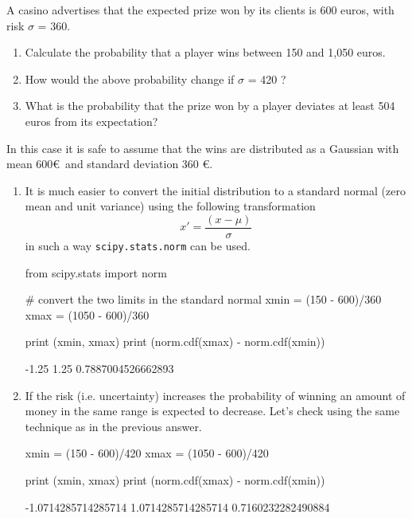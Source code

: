 \begin{question}
A casino advertises that the expected prize won by its clients is 600 euros, with risk $\sigma$ = 360.
\begin{enumerate}[label={\emph{\alph*})}]
	\tightlist
\item Calculate the probability that a player wins between 150 and 1,050 euros.
\item How would the above probability change if $\sigma$ = 420 ?
\item What is the probability that the prize won by a player deviates at least 504 euros from its expectation?
\end{enumerate}
\end{question}

\cprotEnv\begin{solution}
In this case it is safe to assume that the wins are distributed as a Gaussian with mean 600\euro~and standard deviation 360 \euro. 
\begin{enumerate}[label={\emph{\alph*})}]
	\tightlist
\item It is much easier to convert the initial distribution to a standard normal (zero mean and unit variance) using the following transformation
\begin{equation*}
	x' = \frac{(x - \mu)}{\sigma}
\end{equation*}
in such a way \texttt{scipy.stats.norm} can be used.

\begin{ipython}
from scipy.stats import norm

# convert the two limits in the standard normal
xmin = (150 - 600)/360
xmax = (1050 - 600)/360

print (xmin, xmax)
print (norm.cdf(xmax) - norm.cdf(xmin))
\end{ipython}
\begin{ioutput}
-1.25 1.25
0.7887004526662893
\end{ioutput}

\item If the risk (i.e. uncertainty) increases the probability of winning an amount of money in the same range is expected to decrease. Let's check using the same technique as in the previous answer.
\begin{ipython}
xmin = (150 - 600)/420
xmax = (1050 - 600)/420

print (xmin, xmax)
print (norm.cdf(xmax) - norm.cdf(xmin))
\end{ipython}
\begin{ioutput}
-1.0714285714285714 1.0714285714285714
0.7160232282490884
\end{ioutput}


\end{enumerate}
\end{solution}
